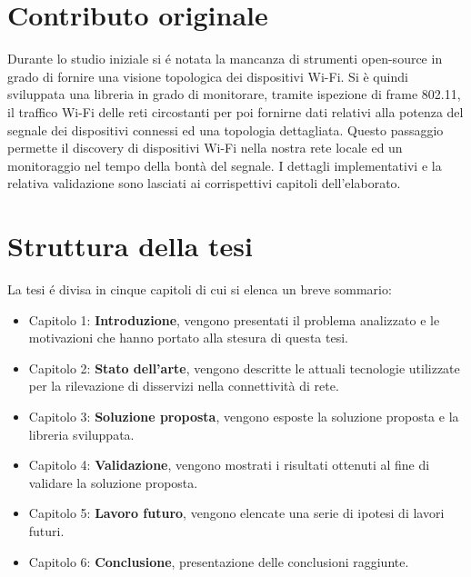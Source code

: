 \section{Contributo originale}

Durante lo studio iniziale si \'e notata la mancanza di strumenti open-source in grado di fornire una visione topologica dei dispositivi Wi-Fi.
Si \`e quindi sviluppata una libreria in grado di monitorare, tramite ispezione di frame 802.11, il traffico Wi-Fi delle reti circostanti per poi fornirne dati relativi alla potenza del segnale dei dispositivi connessi ed una topologia dettagliata.
Questo passaggio permette il discovery di dispositivi Wi-Fi nella nostra rete locale ed un monitoraggio nel tempo della bont\`a del segnale.
I dettagli implementativi e la relativa validazione sono lasciati ai corrispettivi capitoli dell'elaborato.

\newpage

\section{Struttura della tesi}

La tesi \'e divisa in cinque capitoli di cui si elenca un breve sommario:

\begin{itemize}
	\item Capitolo 1: \textbf{Introduzione}, vengono presentati il problema analizzato e le motivazioni che hanno portato alla stesura di questa tesi.
	\item Capitolo 2: \textbf{Stato dell'arte}, vengono descritte le attuali tecnologie utilizzate per la rilevazione di disservizi nella connettivit\`a di rete.
	\item Capitolo 3: \textbf{Soluzione proposta}, vengono esposte la soluzione proposta e la libreria sviluppata. 
	\item Capitolo 4: \textbf{Validazione}, vengono mostrati i risultati ottenuti al fine di validare la soluzione proposta.
	\item Capitolo 5: \textbf{Lavoro futuro}, vengono elencate una serie di ipotesi di lavori futuri.
	\item Capitolo 6: \textbf{Conclusione}, presentazione delle conclusioni raggiunte.
\end{itemize}